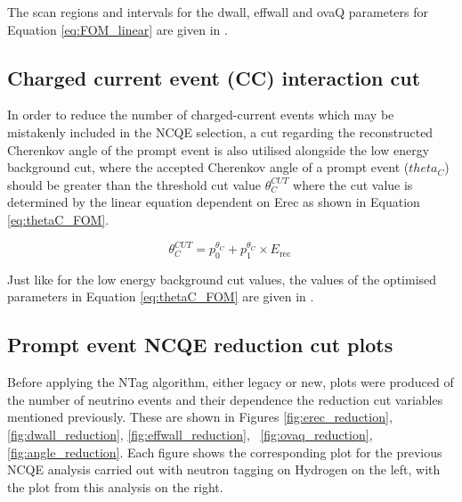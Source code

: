 The scan regions and intervals for the dwall, effwall and ovaQ parameters for Equation \ref{eq:FOM_linear} are given in \cite{Abe_2019}. 

\subsection{Charged current event (CC) interaction cut}

In order to reduce the number of charged-current events which may be mistakenly included in the NCQE selection, a cut regarding the reconstructed Cherenkov angle of the prompt event  is also utilised alongside the low energy background cut, where the accepted Cherenkov angle of a prompt event ($theta_{C}$) should be greater than the threshold cut value $\theta_{C}^{CUT}$ where the cut value is determined by the linear equation dependent on Erec as shown in Equation \ref{eq:thetaC_FOM}.

\begin{equation}
    \theta_{C}^{C U T}=p_{0}^{\theta_{C}}+p_{1}^{\theta_{C}} \times E_{\text {rec }}
    \label{eq:thetaC_FOM} 
\end{equation}

Just like for the low energy background cut values, the values of the optimised parameters in Equation \ref{eq:thetaC_FOM} are given in \cite{Abe_2019}.


\subsection{Prompt event NCQE reduction cut plots}

Before applying the NTag algorithm, either legacy or new, plots were produced of the number of neutrino events and their dependence the reduction cut variables mentioned previously. These are shown in Figures \ref{fig:erec_reduction}, \ref{fig:dwall_reduction}, \ref{fig:effwall_reduction}, \ \ref{fig:ovaq_reduction}, \ref{fig:angle_reduction}. Each figure shows the corresponding plot for the previous NCQE analysis carried out with neutron tagging on Hydrogen on the left, with the plot from this analysis on the right. 


